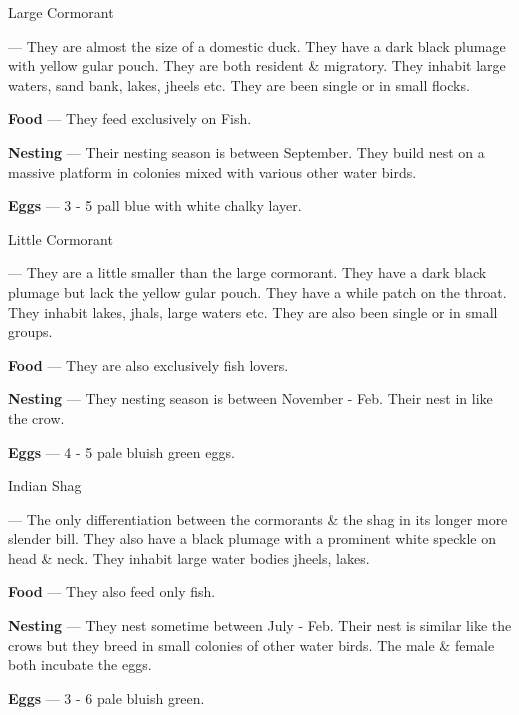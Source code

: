 \begin{bird}{Large Cormorant}

 --- They are almost the size of a domestic duck. They have a dark black plumage with yellow gular pouch. They are both resident \& migratory. They inhabit large waters, sand bank, lakes, jheels etc. They are been single or in small flocks.

{\large\bf Food} --- They feed exclusively on Fish.

{\large\bf Nesting} --- Their nesting season is between September. They build nest on a massive platform in colonies mixed with various other water birds. 

{\large\bf Eggs} --- 3 - 5 pall blue with white chalky layer. 
\end{bird}

\begin{bird}{Little Cormorant}

 --- They are a little smaller than the large cormorant. They have a dark black plumage but lack the yellow gular pouch. They have a while patch on the throat. They inhabit lakes, jhals, large waters etc. They are also been single or in small groups. 

{\large\bf Food} --- They are also exclusively fish lovers.

{\large\bf Nesting} --- They nesting season is between November - Feb. Their nest in like the crow. 

{\large\bf Eggs} --- 4 - 5 pale bluish green eggs.
\end{bird}

\begin{bird}{Indian Shag}

 --- The only differentiation between the cormorants \& the shag in its longer more slender bill. They also have a black plumage with a prominent white speckle on head \& neck. They inhabit large water bodies jheels, lakes.

{\large\bf Food} --- They also feed only fish.

{\large\bf Nesting} --- They nest sometime between July - Feb. Their nest is similar like the crows but they breed in small colonies of other water birds. The male \& female both incubate the eggs. 

{\large\bf Eggs} --- 3 - 6 pale bluish green.
\end{bird}

